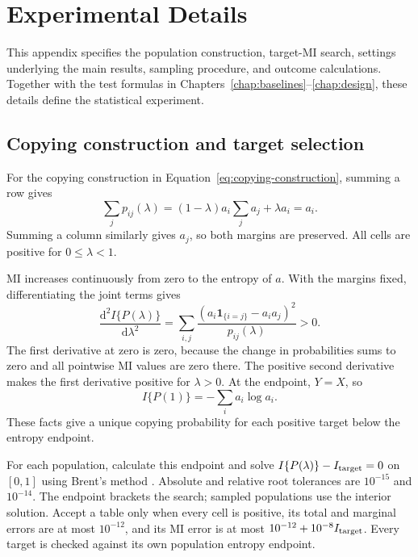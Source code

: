 \chapter{Experimental Details}
\label{app:construction}

This appendix specifies the population construction, target-MI search,
settings underlying the main results, sampling procedure, and outcome
calculations. Together with the test formulas in
Chapters~\ref{chap:baselines}--\ref{chap:design},
these details define the statistical experiment.

\section{Copying construction and target selection}

For the copying construction in Equation~\eqref{eq:copying-construction},
summing a row gives
\begin{equation}
 \sum_jp_{ij}(\lambda)
 =(1-\lambda)a_i\sum_ja_j+\lambda a_i=a_i.
\end{equation}
Summing a column similarly gives \(a_j\), so both margins are preserved.
All cells are positive for \(0\leq\lambda<1\).

MI increases continuously from zero to the entropy of \(a\).
With the margins fixed, differentiating the joint terms gives
\begin{equation}
 \frac{\mathrm d^2 I\{P(\lambda)\}}{\mathrm d\lambda^2}
 =\sum_{i,j}\frac{(a_i\mathbf{1}_{\{i=j\}}-a_i a_j)^2}
                     {p_{ij}(\lambda)}>0.
\end{equation}
The first derivative at zero is zero, because the change in probabilities
sums to zero and all pointwise MI values are zero there. The positive
second derivative makes the first derivative positive for
\(\lambda>0\). At the endpoint, \(Y=X\), so
\begin{equation}
 I\{P(1)\}=-\sum_i a_i\log a_i.
\end{equation}
These facts give a unique copying probability for each positive target
below the entropy endpoint.

For each population, calculate this endpoint and solve
\(I\{P(\lambda)\}-I_{\rm target}=0\) on \([0,1]\) using Brent's
method \citep{brent1973}. Absolute and relative root tolerances are
\(10^{-15}\) and \(10^{-14}\). The endpoint brackets the search;
sampled populations use the interior solution. Accept a table only when
every cell is positive, its total and marginal errors are at most
\(10^{-12}\), and its MI error is at most
\(10^{-12}+10^{-8}I_{\rm target}\). Every target is checked against its own population entropy endpoint.

